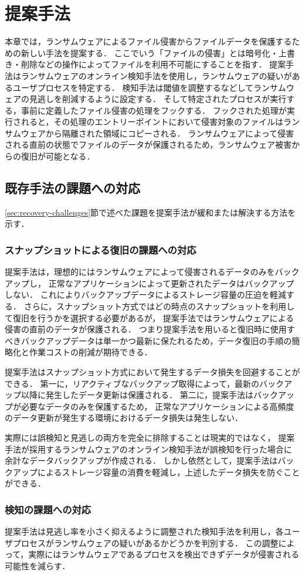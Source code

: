 \chapter{提案手法}
本章では，ランサムウェアによるファイル侵害からファイルデータを保護するための新しい手法を提案する．
ここでいう「ファイルの侵害」とは暗号化・上書き・削除などの操作によってファイルを利用不可能にすることを指す．
提案手法はランサムウェアのオンライン検知手法を使用し，ランサムウェアの疑いがあるユーザプロセスを特定する．
検知手法は閾値を調整するなどしてランサムウェアの見逃しを削減するように設定する．
そして特定されたプロセスが実行する，事前に定義したファイル侵害の処理をフックする．
フックされた処理が実行されると，その処理のエントリーポイントにおいて侵害対象のファイルはランサムウェアから隔離された領域にコピーされる．
ランサムウェアによって侵害される直前の状態でファイルのデータが保護されるため，ランサムウェア被害からの復旧が可能となる．

\section{既存手法の課題への対応}
\ref{sec:recovery-challenges}節で述べた課題を提案手法が緩和または解決する方法を示す．
\subsection{スナップショットによる復旧の課題への対応}
提案手法は，理想的にはランサムウェアによって侵害されるデータのみをバックアップし，
正常なアプリケーションによって更新されたデータはバックアップしない．
これによりバックアップデータによるストレージ容量の圧迫を軽減する．
さらに，スナップショット方式ではどの時点のスナップショットを利用して復旧を行うかを選択する必要があるが，
提案手法ではランサムウェアによる侵害の直前のデータが保護される．
つまり提案手法を用いると復旧時に使用すべきバックアップデータは単一かつ最新に保たれるため，データ復旧の手順の簡略化と作業コストの削減が期待できる．

提案手法はスナップショット方式において発生するデータ損失を回避することができる．
第一に，リアクティブなバックアップ取得によって，最新のバックアップ以降に発生したデータ更新は保護される．
第二に，提案手法はバックアップが必要なデータのみを保護するため，
正常なアプリケーションによる高頻度のデータ更新が発生する環境におけるデータ損失は発生しない．

実際には誤検知と見逃しの両方を完全に排除することは現実的ではなく，
提案手法が採用するランサムウェアのオンライン検知手法が誤検知を行った場合に
余計なデータバックアップが作成される．
しかし依然として，提案手法はバックアップによるストレージ容量の消費を軽減し，上述したデータ損失を防ぐことができる．

\subsection{検知の課題への対応}
提案手法は見逃し率を小さく抑えるように調整された検知手法を利用し，各ユーザプロセスがランサムウェアの疑いがあるかどうかを判別する．
この調整によって，実際にはランサムウェアであるプロセスを検出できずデータが侵害される可能性を減らす．


